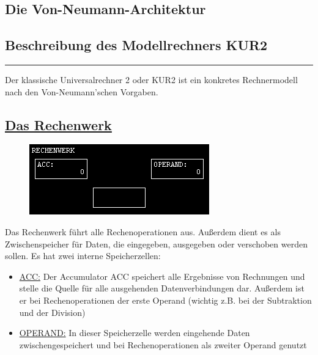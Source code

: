 \documentclass[a4paper,12pt]{article}
\begin{document}
\begin{center}
\section*{Die Von-Neumann-Architektur}
\subsection*{Beschreibung des Modellrechners KUR2}
\end{center}

\hrule
\vspace{.5cm}

Der klassische Universalrechner 2 oder KUR2 ist ein konkretes Rechnermodell nach den Von-Neumann'schen Vorgaben.\\

\subsection*{\underline{Das Rechenwerk}}
\begin{figure}[h]
\centering
\includegraphics[scale=.75]{ALU.png}
\end{figure}

Das Rechenwerk führt alle Rechenoperationen aus. Außerdem dient es als Zwischenspeicher für Daten, die eingegeben, ausgegeben oder verschoben werden sollen. Es hat zwei interne Speicherzellen:
\begin{itemize}
\item \underline{ACC:} Der Accumulator ACC speichert alle Ergebnisse von Rechnungen und stelle die Quelle für alle ausgehenden Datenverbindungen dar. Außerdem ist er bei Rechenoperationen der erste Operand (wichtig z.B. bei der Subtraktion und der Division)
\item \underline{OPERAND:} In dieser Speicherzelle werden eingehende Daten zwischengespeichert und bei Rechenoperationen als zweiter Operand genutzt
\end{itemize}
\end{document}
